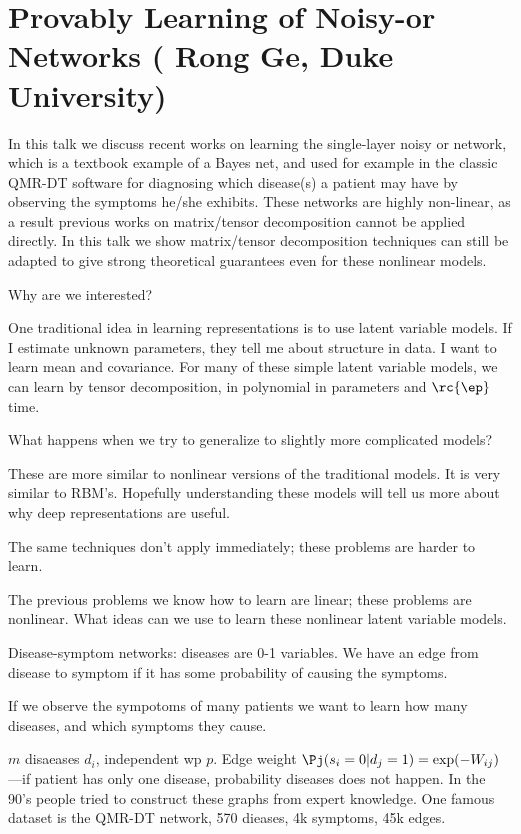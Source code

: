 \section{Provably Learning of Noisy-or Networks (
Rong Ge, Duke University)}

In this talk we discuss recent works on learning the single-layer noisy or network, which is a textbook example of a Bayes net, and used for example in the classic QMR-DT software for diagnosing which disease(s) a patient may have by observing the symptoms he/she exhibits. These networks are highly non-linear, as a result previous works on matrix/tensor decomposition cannot be applied directly. In this talk we show matrix/tensor decomposition techniques can still be adapted to give strong theoretical guarantees even for these nonlinear models.

Why are we interested? 

One traditional idea in learning representations is to use latent variable models. If I estimate unknown parameters, they tell me about structure in data. I want to learn mean and covariance. For many of these simple latent variable models, we can learn by tensor decomposition, in polynomial in parameters and $\rc{\ep}$ time.

What happens when we try to generalize to slightly more complicated models?

These are more similar to nonlinear versions of the traditional models. It is very similar to RBM's. Hopefully understanding these models will tell us more about why deep representations are useful.

The same techniques don't apply immediately; these problems are harder to learn.

The previous problems we know how to learn are linear; these problems are nonlinear. What ideas can we use to learn these nonlinear latent variable models. 

Disease-symptom networks: diseases are 0-1 variables. We have an edge from disease to symptom if it has some probability of causing the symptoms.

If we observe the sympotoms of many patients we want to learn how many diseases, and which symptoms they cause.

$m$ disaeases $d_i$, independent wp $p$. Edge weight $\Pj(s_i=0|d_j=1) = \exp(-W_{ij})$---if patient has only one disease, probability diseases does not happen. In the 90's people tried to construct these graphs from expert knowledge. One famous dataset is the QMR-DT network, 570 dieases, 4k symptoms, 45k edges.

